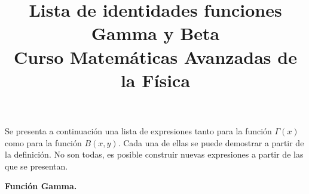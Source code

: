 
%
\setlength{\jot}{12pt}
\title{Lista de identidades funciones Gamma y Beta \\ {\large Curso Matemáticas Avanzadas de la Física}\vspace{-1.5\baselineskip}}
\author{}
\date{}

\maketitle
\fontsize{14}{14}\selectfont
Se presenta a continuación una lista de expresiones tanto para la función $\Gamma (x)$ como para la función $B (x, y)$. Cada una de ellas se puede demostrar a partir de la definición. No son todas, es posible construir nuevas expresiones a partir de las que se presentan.
\\\hspace*{\fill}

\textbf{Función Gamma.}

